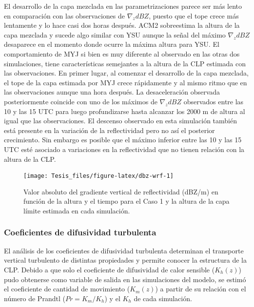 \documentclass[12pt,spanish,oneside, a4paper]{book}
\begin{document}
El desarrollo de la capa mezclada en las parametrizaciones parece ser
más lento en comparación con las observaciones de \(\nabla_{z}dBZ\),
puesto que el tope crece más lentamente y lo hace casi dos horas
después. ACM2 sobreestima la altura de la capa mezclada y sucede algo
similar con YSU aunque la señal del máximo \(\nabla_{z}dBZ\) desaparece
en el momento donde ocurre la máxima altura para YSU. El comportamiento
de MYJ si bien es muy diferente al observado en las otras dos
simulaciones, tiene características semejantes a la altura de la CLP
estimada con las observaciones. En primer lugar, al comenzar el
desarrollo de la capa mezclada, el tope de la capa estimada por MYJ
crece rápidamente y al mismo ritmo que en las observaciones aunque una
hora después. La desaceleración observada posteriormente coincide con
uno de los máximos de \(\nabla_{z}dBZ\) observados entre las 10 y las 15
UTC para luego profundizarse hasta alcanzar los 2000 m de altura al
igual que las observaciones. El descenso observado en esta simulación
también está presente en la variación de la reflectividad pero no así el
posterior crecimiento. Sin embargo es posible que el máximo inferior
entre las 10 y las 15 UTC esté asociado a variaciones en la
reflectividad que no tienen relación con la altura de la CLP.

\begin{figure}

{\centering \texttt{[image: Tesis\_files/figure-latex/dbz-wrf-1]} 

}

\caption{Valor absoluto del gradiente vertical de reflectividad (dBZ/m) en función de la altura y el tiempo para el Caso 1 y la altura de la capa límite estimada en cada simulación. \label{dbz-wrf}}\label{fig:dbz-wrf}
\end{figure}

\subsubsection{Coeficientes de difusividad
turbulenta}\label{coeficientes-de-difusividad-turbulenta-1}

El análisis de los coeficientes de difusividad turbulenta determinan el
transporte vertical turbulento de distintas propiedades y permite
conocer la estructura de la CLP. Debido a que solo el coeficiente de
difusividad de calor sensible (\(K_h(z)\)) pudo obtenerse como variable
de salida en las simulaciones del modelo, se estimó el coeficiente de
cantidad de movimiento (\(K_m(z)\)) a partir de su relación con el
número de Prandtl (\(Pr = K_m/K_h\)) y el \(K_h\) de cada simulación.
\end{document}
